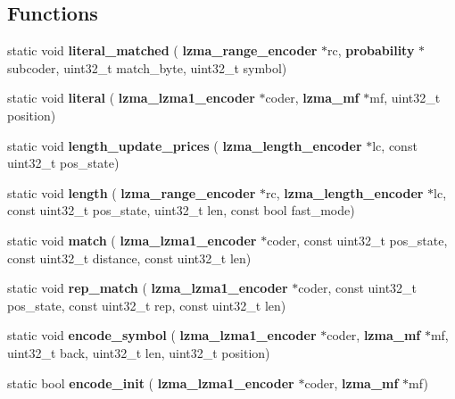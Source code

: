 \subsection*{Functions}
\begin{DoxyCompactItemize}
\item 
\mbox{\label{lzma__encoder_8c_a276c6d863c72ad4e56fa1034142fcb85}} 
static void {\bfseries literal\+\_\+matched} (\textbf{ lzma\+\_\+range\+\_\+encoder} $\ast$rc, \textbf{ probability} $\ast$subcoder, uint32\+\_\+t match\+\_\+byte, uint32\+\_\+t symbol)
\item 
\mbox{\label{lzma__encoder_8c_a1a299da76090f5aa13a6c2960657a64a}} 
static void {\bfseries literal} (\textbf{ lzma\+\_\+lzma1\+\_\+encoder} $\ast$coder, \textbf{ lzma\+\_\+mf} $\ast$mf, uint32\+\_\+t position)
\item 
\mbox{\label{lzma__encoder_8c_af7b06ec5cf3bb55193e2e3bcc236ee23}} 
static void {\bfseries length\+\_\+update\+\_\+prices} (\textbf{ lzma\+\_\+length\+\_\+encoder} $\ast$lc, const uint32\+\_\+t pos\+\_\+state)
\item 
\mbox{\label{lzma__encoder_8c_a3df350e3a724f22844bcfaca65620695}} 
static void {\bfseries length} (\textbf{ lzma\+\_\+range\+\_\+encoder} $\ast$rc, \textbf{ lzma\+\_\+length\+\_\+encoder} $\ast$lc, const uint32\+\_\+t pos\+\_\+state, uint32\+\_\+t len, const bool fast\+\_\+mode)
\item 
\mbox{\label{lzma__encoder_8c_aa4e08b0417394ac7b3b704de9ade5b7b}} 
static void {\bfseries match} (\textbf{ lzma\+\_\+lzma1\+\_\+encoder} $\ast$coder, const uint32\+\_\+t pos\+\_\+state, const uint32\+\_\+t distance, const uint32\+\_\+t len)
\item 
\mbox{\label{lzma__encoder_8c_aed31765f836deefce6d1ebcf2ef5b4fe}} 
static void {\bfseries rep\+\_\+match} (\textbf{ lzma\+\_\+lzma1\+\_\+encoder} $\ast$coder, const uint32\+\_\+t pos\+\_\+state, const uint32\+\_\+t rep, const uint32\+\_\+t len)
\item 
\mbox{\label{lzma__encoder_8c_a5c8d5d755284c341a9d2e6b5e87b3e5a}} 
static void {\bfseries encode\+\_\+symbol} (\textbf{ lzma\+\_\+lzma1\+\_\+encoder} $\ast$coder, \textbf{ lzma\+\_\+mf} $\ast$mf, uint32\+\_\+t back, uint32\+\_\+t len, uint32\+\_\+t position)
\item 
\mbox{\label{lzma__encoder_8c_a654304e689fe86c1e6783b2ed6c329da}} 
static bool {\bfseries encode\+\_\+init} (\textbf{ lzma\+\_\+lzma1\+\_\+encoder} $\ast$coder, \textbf{ lzma\+\_\+mf} $\ast$mf)
\item 
\mbox{\label{lzma__encoder_8c_a9fe05befef8028d720ac11b6969b5543}} 

\end{DoxyCompactItemize}
